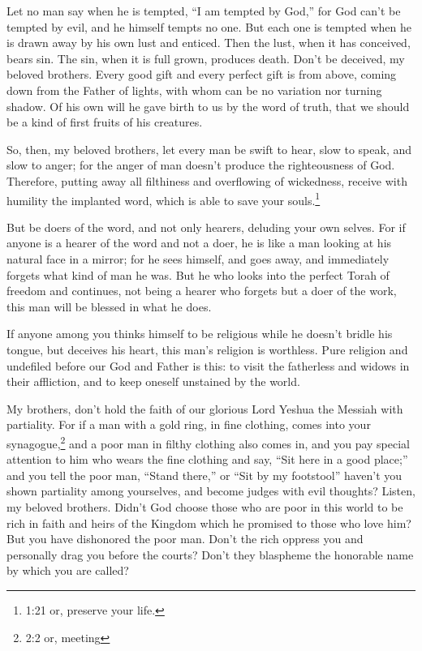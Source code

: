 \myverse{}Let no man say when he is tempted, “I am tempted by God,” for
God can’t be tempted by evil, and he himself tempts no one.
\myverse{}But each one is tempted when he is drawn away by his own lust and enticed.
\myverse{}Then the lust, when it has conceived, bears sin. The sin, when it is full
grown, produces death.
\myverse{}Don’t be deceived, my beloved brothers.
\myverse{}Every good gift and every perfect gift is from above, coming down from the
Father of lights, with whom can be no variation nor turning shadow.
\myverse{}Of his own will he gave birth to us by the word of truth, that we should be
a kind of first fruits of his creatures.

\myverse{}So, then, my beloved brothers, let every man be swift to hear,
slow to speak, and slow to anger;
\myverse{}for the anger of man doesn’t produce the righteousness of God.
\myverse{}Therefore, putting away all filthiness and overflowing of wickedness, receive
with humility the implanted word, which is able to save your souls.\footnote{1:21 or, preserve your life.}

\myverse{}But be doers of the word, and not only hearers, deluding your
own selves.
\myverse{}For if anyone is a hearer of the word and not a doer, he is like a man looking
at his natural face in a mirror;
\myverse{}for he sees himself, and goes away, and immediately forgets what kind of man
he was.
\myverse{}But he who looks into the perfect Torah of freedom and continues, not being
a hearer who forgets but a doer of the work, this man will be blessed in what he does.

\myverse{}If anyone among you thinks himself to be religious while he doesn’t
bridle his tongue, but deceives his heart, this man’s religion is worthless.
\myverse{}Pure religion and undefiled before our God and Father is this: to visit the
fatherless and widows in their affliction, and to keep oneself unstained by the world.


\mychapter{} \myverse*{}My brothers, don’t hold the faith of our glorious Lord Yeshua the Messiah
with partiality.
\myverse{}For if a man with a gold ring, in fine clothing, comes into your synagogue,\footnote{2:2 or, meeting} and a poor man in filthy clothing also comes in,
\myverse{}and you pay special attention to him who wears the fine clothing and say, “Sit
here in a good place;” and you tell the poor man, “Stand there,” or “Sit by my footstool”
\myverse{}haven’t you shown partiality among yourselves, and become judges with evil thoughts?
\myverse{}Listen, my beloved brothers. Didn’t God choose those who are poor in this world
to be rich in faith and heirs of the Kingdom which he promised to those who love him?
\myverse{}But you have dishonored the poor man. Don’t the rich oppress you and personally
drag you before the courts?
\myverse{}Don’t they blaspheme the honorable name by which you are called?

